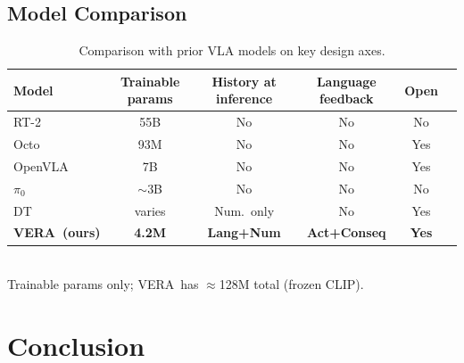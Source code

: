 \documentclass{article}
\newcommand{\modelname}{\textsc{VERA}\xspace}
\begin{document}
\subsection{Model Comparison}

\begin{table}[h]
\centering
\caption{Comparison with prior VLA models on key design axes.}
\label{tab:comparison}
\small
\begin{tabular}{lccccc}
\toprule
\textbf{Model} & \textbf{Trainable params} & \textbf{History at inference}
               & \textbf{Language feedback} & \textbf{Open} \\
\midrule
RT-2~\citep{brohan2023rt2}         & 55B       & No          & No            & No  \\
Octo~\citep{octo2024}              & 93M       & No          & No            & Yes \\
OpenVLA~\citep{kim2024openvla}     & 7B        & No          & No            & Yes \\
$\pi_0$~\citep{black2024pi0}       & $\sim$3B  & No          & No            & No  \\
DT~\citep{chen2021decision}        & varies    & Num.\ only  & No            & Yes \\
\midrule
\textbf{\modelname\ (ours)}        & \textbf{4.2M} & \textbf{Lang+Num}
                                   & \textbf{Act+Conseq} & \textbf{Yes}  \\
\bottomrule
\end{tabular}
\vspace{2pt}\\
\footnotesize Trainable params only; \modelname\ has $\approx$128M total (frozen CLIP).
\end{table}

\section{Conclusion}
\label{sec:conclusion}
\end{document}
